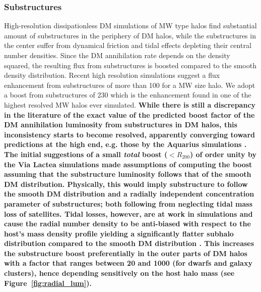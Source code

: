 \documentclass[10pt,aps,pra,reprint,amsmath,amsfonts,amssymb,showpacs,nofootinbib,floatfix]{revtex4-1}
\def\C#1{{\bf #1}}
\begin{document}
\subsubsection{Substructures}
\label{sect:subst}
High-resolution dissipationless DM simulations of MW type halos find substantial
amount of substructures in the periphery of DM halos, while the substructures in
the center suffer from dynamical friction and tidal effects depleting their
central number densities. Since the DM annihilation rate depends on the density
squared, the resulting flux from substructures is boosted compared to the smooth
density distribution. Recent high resolution simulations suggest a flux
enhancement from substructures of more than 100 \cite{2008MNRAS.391.1685S,
  2010ApJ...718..899A} for a MW size halo. We adopt a boost from substructures
of 230 which is the enhancement found in one of the highest resolved MW halos
ever simulated. \C{While there is still a discrepancy in the literature of the
  exact value of the predicted boost factor of the DM annihilation luminosity
  from substructures in DM halos, this inconsistency starts to become resolved,
  apparently converging toward predictions at the high end, e.g. those by the
  Aquarius simulations \protect \cite{2008MNRAS.391.1685S,
    2008Natur.456...73S}. The initial suggestions of a small {\em total} boost
  ($<R_{200}$) of order unity by the Via Lactea simulations
  \cite{2008JPhCS.125a2008K} made assumptions of computing the boost assuming
  that the substructure luminosity follows that of the smooth DM
  distribution. Physically, this would imply substructure to follow the smooth
  DM distribution and a radially independent concentration parameter of
  substructures; both following from neglecting tidal mass loss of
  satellites. Tidal losses, however, are at work in simulations and cause the
  radial number density to be anti-biased with respect to the host's mass
  density profile yielding a significantly flatter subhalo distribution compared
  to the smooth DM distribution \cite{2010ApJ...718..899A}. This increases the
  substructure boost preferentially in the outer parts of DM halos with a factor
  that ranges between 20 and 1000 (for dwarfs and galaxy clusters), hence
  depending sensitively on the host halo mass (see
  Figure~\ref{fig:radial_lum}).}  
\end{document}
